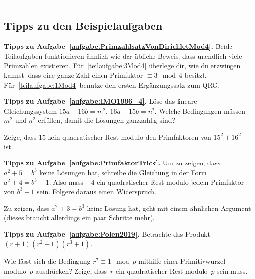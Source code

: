 \newpage\phantom{newpage}\vfill\hrule\vspace{-1em}
\subsection*{Tipps zu den Beispielaufgaben}

\textbf{Tipps zu Aufgabe~\ref{aufgabe:PrimzahlsatzVonDirichletMod4}.} Beide Teilaufgaben funktionieren ähnlich wie der übliche Beweis, dass unendlich viele Primzahlen existieren. Für~\ref{teilaufgabe:3Mod4} überlege dir, wie du erzwingen kannst, dass eine ganze Zahl einen Primfaktor $\equiv 3\mod 4$ besitzt. Für~\ref{teilaufgabe:1Mod4} benutze den ersten Ergänzungssatz zum QRG.



\textbf{Tipps zu Aufgabe~\ref{aufgabe:IMO1996_4}.} Löse das lineare Gleichungssystem $15a+16b=m^2$, $16a-15b=n^2$. Welche Bedingungen müssen $m^2$ und $n^2$ erfüllen, damit die Lösungen ganzzahlig sind?

Zeige, dass $15$ kein quadratischer Rest modulo den Primfaktoren von $15^2+16^2$ ist.

\textbf{Tipps zu Aufgabe~\ref{aufgabe:PrimfaktorTrick}.} Um zu zeigen, dass $a^2+5=b^3$ keine Lösungen hat, schreibe die Gleichung in der Form $a^2+4=b^3-1$. Also muss $-4$ ein quadratischer Rest modulo jedem Primfaktor von $b^3-1$ sein. Folgere daraus einen Widerspruch.

Zu zeigen, dass $a^2+3=b^3$ keine Lösung hat, geht mit einem ähnlichen Argument (dieses braucht allerdings ein paar Schritte mehr).

\textbf{Tipps zu Aufgabe~\ref{aufgabe:Polen2019}.} Betrachte das Produkt $(r+1)(r^2+1)(r^3+1)$.

Wie lässt sich die Bedingung $r^7\equiv 1\mod p$ mithilfe einer Primitivwurzel modulo~$p$ ausdrücken? Zeige, dass~$r$ ein quadratischer Rest modulo~$p$ sein muss.
